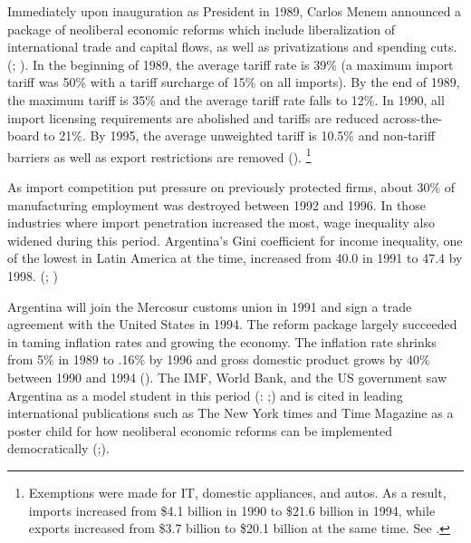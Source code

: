 \documentclass[12pt]{report}
\begin{document}
Immediately upon inauguration as President in 1989, Carlos Menem announced a package of neoliberal
economic reforms which include liberalization of international trade and capital flows, as well as
privatizations and spending cuts. (\citealt[189]{Tommasi:1995wx}; \citealt{Borner:2002cp}). In the
beginning of 1989, the average tariff rate is 39\% (a maximum import tariff was 50\% with a tariff
surcharge of 15\% on all imports). By the end of 1989, the maximum tariff is 35\% and the average
tariff rate falls to 12\%. In 1990, all import licensing requirements are abolished and tariffs are
reduced across-the-board to 21\%. By 1995, the average unweighted tariff is 10.5\% and non-tariff
barriers as well as export restrictions are removed (\citealt[7]{Beker:2011vq}).
\footnote{Exemptions were made for IT, domestic appliances, and autos. As a result, imports
increased from \$4.1 billion in 1990 to \$21.6 billion in 1994, while exports increased from \$3.7
billion to \$20.1 billion at the same time. See \citet{Beker:2011vq}.}

As import competition put pressure on previously protected firms, about 30\% of manufacturing
employment was destroyed between 1992 and 1996. In those industries where import penetration
increased the most, wage inequality also widened during this period. Argentina's Gini coefficient
for income inequality, one of the lowest in Latin America at the time, increased from 40.0 in 1991
to 47.4 by 1998. (\citealt[505]{Galiani:2003fr}; \citealt[11]{Beker:2011vq})

Argentina will join the Mercosur customs union in 1991 and sign a trade agreement with the United
States in 1994. The reform package largely succeeded in taming inflation rates and growing the
economy. The inflation rate shrinks from 5\% in 1989 to .16\% by 1996 and gross domestic product
grows by 40\% between 1990 and 1994 (\citealt[4]{Beker:2011vq}). The IMF, World Bank, and the US
government saw Argentina as a model student in this period (\citealt{Cavallo:2004ta}:
\citealt[142]{Cavallo:2004bf};\citealt{Klein:2002vg}) and is cited in leading
international publications such as The New York times and Time Magazine as a poster child for how
neoliberal economic reforms can be implemented democratically (\citealt{stokes2001public};\citealt{Silverstein:2002wm}).
\end{document}
